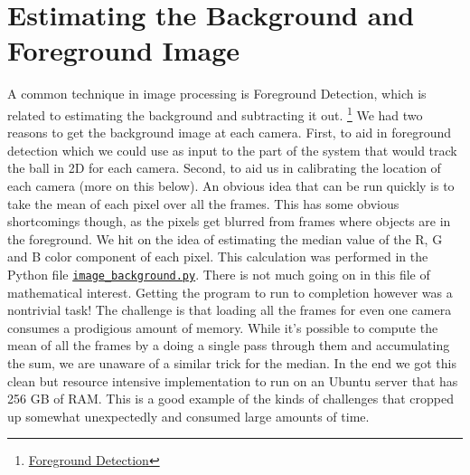 \documentclass{article}
\begin{document}
\newpage
\section{Estimating the Background and Foreground Image}
A common technique in image processing is Foreground Detection, which is related to estimating the background and subtracting it out.
\footnote{\href{https://en.wikipedia.org/wiki/Foreground_detection}{Foreground Detection}}
We had two reasons to get the background image at each camera.  
First, to aid in foreground detection which we could use as input to the part of the system that would track the ball
in 2D for each camera.  Second, to aid us in calibrating the location of each camera (more on this below).
An obvious idea that can be run quickly is to take the mean of each pixel over all the frames.
This has some obvious shortcomings though, as the pixels get blurred from frames where objects are in the foreground.
We hit on the idea of estimating the median value of the R, G and B color component of each pixel.
This calculation was performed in the Python file 
\href{https://github.com/Harvard-AM-205-Basketball/Basketball/blob/master/src/image_background.py}
{\texttt{image\_background.py}}.
There is not much going on in this file of mathematical interest.  
Getting the program to run to completion however was a nontrivial task!  
The challenge is that loading all the frames for even one camera  
consumes a prodigious amount of memory.  
While it's possible to compute the mean of all the frames by a doing a single pass through them
and accumulating the sum, we are unaware of a similar trick for the median.
In the end we got this clean but resource intensive implementation to run on an Ubuntu server that has 256 GB of RAM.  
This is a good example of the kinds of challenges that cropped up somewhat unexpectedly and consumed large amounts of time.
\end{document}

